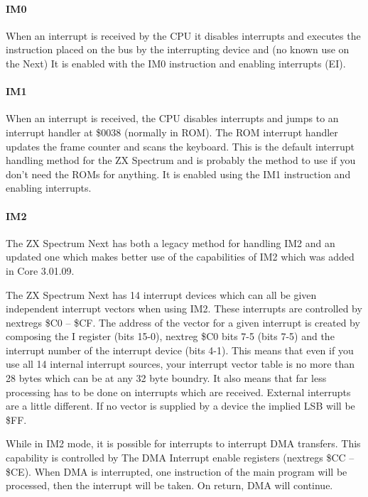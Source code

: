\paragraph{IM0}
When an interrupt is received by the CPU it disables interrupts and
executes the instruction placed on the bus by the interrupting device
and (no known use on the Next) It is enabled with the IM0 instruction
and enabling interrupts (EI).

\paragraph{IM1}
When an interrupt is received, the CPU disables interrupts and jumps
to an interrupt handler at \$0038 (normally in ROM). The ROM interrupt
handler updates the frame counter and scans the keyboard. This is the
default interrupt handling method for the ZX Spectrum and is probably
the method to use if you don’t need the ROMs for anything. It is
enabled using the IM1 instruction and enabling interrupts.

\paragraph{IM2}
The ZX Spectrum Next has both a legacy method for handling IM2 and an
updated one which makes better use of the capabilities of IM2 which
was added in Core 3.01.09.

The ZX Spectrum Next has 14 interrupt devices which can all be given
independent interrupt vectors when using IM2. These interrupts are
controlled by nextregs \$C0 -- \$CF.  The address of the vector for a
given interrupt is created by composing the I register (bits 15-0),
nextreg \$C0 bits 7-5 (bits 7-5) and the interrupt number of the
interrupt device (bits 4-1). This means that even if you use all 14
internal interrupt sources, your interrupt vector table is no more
than 28 bytes which can be at any 32 byte boundry. It also means that
far less processing has to be done on interrupts which are
received. External interrupts are a little different. If no vector is
supplied by a device the implied LSB will be \$FF.

While in IM2 mode, it is possible for interrupts to interrupt DMA
transfers. This capability is controlled by The DMA Interrupt enable
registers (nextregs \$CC -- \$CE). When DMA is interrupted, one
instruction of the main program will be processed, then the interrupt
will be taken. On return, DMA will continue.





